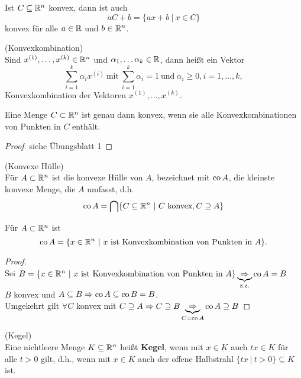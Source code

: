 \begin{Lemma}
	Ist $C\subseteq \mathbb R^n$ konvex, dann ist auch
	\begin{equation*}
		aC + b = \lbrace ax+b ~\vert~ x\in C \rbrace
	\end{equation*}
	konvex f\"ur alle $a\in\mathbb R$ und $b\in\mathbb R^n$.
\end{Lemma}

\begin{Definition}(Konvexkombination)\\
	Sind $x^{(1)},\dots,x^{(k)}\in\mathbb R^n$ und $\alpha_1,\dots\alpha_k \in\mathbb R$, dann hei\ss t ein Vektor
	\begin{equation*}
		\sum\limits_{i=1}^k\alpha_ix^{(i)}~ \text{mit} ~ \sum\limits_{i=1}^k \alpha_i = 1~ \text{und} ~ \alpha_i\geq 0, i=1,\dots,k,
	\end{equation*}
	Konvexkombination der Vektoren $x^{(1)},\dots,x^{(k)}$.
\end{Definition}
\begin{Satz}
Eine Menge $C\subset\mathbb R^n$ ist genau dann konvex, wenn sie alle Konvexkombinationen von Punkten in $C$ enth\"alt.
\end{Satz}
\begin{proof} siehe Übungsblatt 1
\end{proof}

\begin{Definition}(Konvexe H\"ulle)\\
	F\"ur $A\subset\mathbb R^n$ ist die konvexe H\"ulle von $A$, bezeichnet mit $\operatorname{co} A$, die kleinste konvexe Menge, die $A$ umfasst, d.h.
	\begin{equation*}
		\operatorname{co} A = \bigcap\lbrace C\subseteq \mathbb R^n ~\vert~ C~\text{konvex}, C\supseteq A \rbrace
	\end{equation*}
\end{Definition}
\begin{Lemma}
	F\"ur $A\subset\mathbb R^n$ ist
	\begin{equation*}
		\operatorname{co} A = \lbrace x\in \mathbb R^n ~\vert~ x ~\text{ist Konvexkombination von Punkten in }A\rbrace.
	\end{equation*}
\end{Lemma}
\begin{proof}~\\
	Sei $B=\lbrace x\in\mathbb R^n ~\vert~ x \text{ ist Konvexkombination von Punkten in } A \rbrace \underbrace{\Rightarrow}_{\text{z.z.}} \operatorname{co} A = B$\\
	$B$ konvex und $A\subseteq B \Rightarrow \operatorname{co} A \subseteq \operatorname{co} B = B$.\\
	Umgekehrt gilt $\forall C$ konvex mit $C\supseteq A \Rightarrow C\supseteq B \underbrace{\Rightarrow}_{C=\operatorname{co} A} \operatorname{co} A \supseteq B$
\end{proof}
\begin{Definition}(Kegel)~\\
	Eine nichtleere Menge $K\subseteq\mathbb R^n$ hei\ss t \textbf{Kegel}, wenn mit $x\in K$ auch $tx\in K$ f\"ur alle $t>0$ gilt, d.h., wenn mit $x\in K$ auch der offene Halbstrahl $\lbrace tx ~\vert~ t>0\rbrace\subseteq K$ ist.
\end{Definition}

